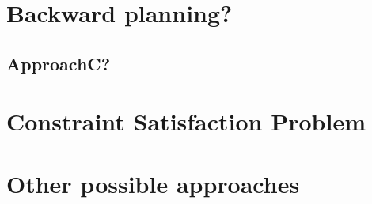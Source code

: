 \section{Backward planning?}

\subsection{ApproachC?}

\section{Constraint Satisfaction Problem}


 \citep{Karakatic2015}

\section{Other possible approaches}


